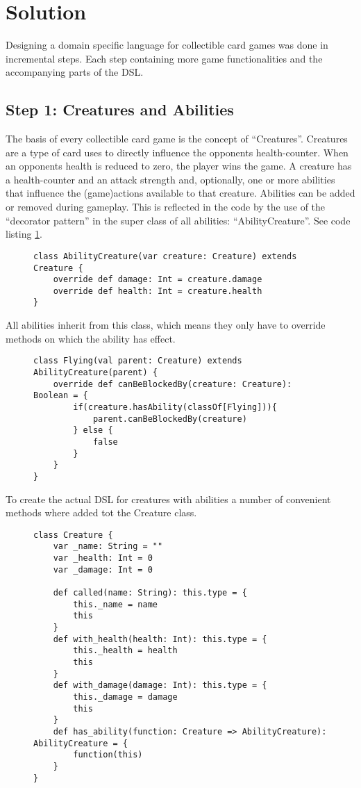 \documentclass[twocolumn]{phdsymp}
\begin{document}
\section{Solution}
Designing a domain specific language for collectible card games was done in incremental steps. Each step containing more game functionalities and the accompanying parts of the DSL.
\subsection*{Step 1: Creatures and Abilities}
The basis of every collectible card game is the concept of ``Creatures''. Creatures are a type of card uses to directly influence the opponents health-counter. When an opponents health is reduced to zero, the player wins the game. A creature has a health-counter and an attack strength and, optionally, one or more abilities that influence the (game)actions available to that creature. Abilities can be added or removed during gameplay. This is reflected in the code by the use of the ``decorator pattern'' in the super class of all abilities: ``AbilityCreature''. See code listing \ref{Code Listing 1}.
\begin{figure}[H]
\label{Code Listing 1}
\begin{verbatim}
class AbilityCreature(var creature: Creature) extends Creature {
    override def damage: Int = creature.damage
    override def health: Int = creature.health
}
\end{verbatim}
\end{figure}
All abilities inherit from this class, which means they only have to override methods on which the ability has effect.
\begin{figure}[H]
\label{Code Listing 2}
\begin{verbatim}
class Flying(val parent: Creature) extends AbilityCreature(parent) {
    override def canBeBlockedBy(creature: Creature): Boolean = {
        if(creature.hasAbility(classOf[Flying])){
            parent.canBeBlockedBy(creature)
        } else {
            false
        }
    }
}
\end{verbatim}
\end{figure}
To create the actual DSL for creatures with abilities a number of convenient methods where added tot the Creature class.
\begin{figure}[H]
\label{Code Listing 3}
\begin{verbatim}
class Creature {
    var _name: String = ""
    var _health: Int = 0
    var _damage: Int = 0

    def called(name: String): this.type = {
        this._name = name
        this
    }
    def with_health(health: Int): this.type = {
        this._health = health
        this
    }
    def with_damage(damage: Int): this.type = {
        this._damage = damage
        this
    }
    def has_ability(function: Creature => AbilityCreature): AbilityCreature = {
        function(this)
    }
}
\end{verbatim}
\end{figure}
\end{document}
